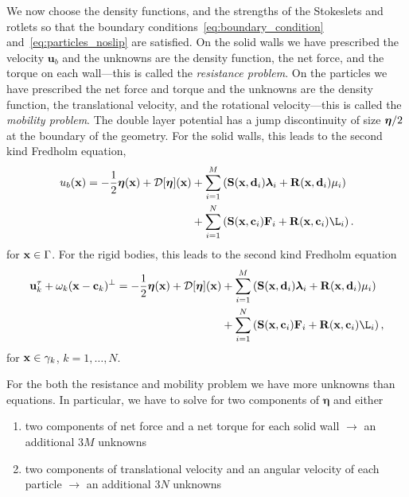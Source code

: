 \documentclass[preprint, 10pt]{elsarticle}
\begin{document}
We now choose the density functions, and the strengths of the Stokeslets
and rotlets so that the boundary
conditions~\eqref{eq:boundary_condition} and~\eqref{eq:particles_noslip}
are satisfied.  On the solid walls we have prescribed the velocity
$\mathbf{u}_b$ and the unknowns are the density function, the net force,
and the torque on each wall---this is called the {\em resistance
problem}. On the particles we have prescribed the net force and torque
and the unknowns are the density function, the translational velocity,
and the rotational velocity---this is called the {\em mobility problem}.
The double layer potential has a jump discontinuity of size ${\boldsymbol\eta}/2$ at
the boundary of the geometry.  For the solid walls, this leads to the
second kind Fredholm equation,
\begin{equation}
  \label{eq:vel_walls} 
  \begin{aligned}
  u_b(\xx) = -\frac{1}{2}\eeta(\xx) + 
    \mathcal{D}[\eeta](\mathbf{x}) 
    &+ \sum_{i=1}^{M} \left(\mathbf{S}(\xx,\dd_i)\llambda_i +
    \mathbf{R}(\xx,\dd_i)\mu_i\right)  \\
    &+ \sum_{i=1}^{N} \left(\mathbf{S}(\xx,\cc_i)\FF_i +
    \mathbf{R}(\xx,\cc_i)\L_i\right).
  \end{aligned}
\end{equation}
for ${\mathbf{x}} \in \Gamma$.  For the rigid bodies, this leads to the second kind Fredholm equation
\begin{equation}
  \label{eq:vel_particles} 
  \begin{aligned}
  \uu_k^\tau + \omega_k(\xx - \cc_k)^\perp
  = -\frac{1}{2}\eeta(\xx) + 
    \mathcal{D}[\eeta](\mathbf{x}) 
    &+ \sum_{i=1}^{M} \left(\mathbf{S}(\xx,\dd_i)\llambda_i +
    \mathbf{R}(\xx,\dd_i)\mu_i\right) \\
    &+ \sum_{i=1}^{N} \left(\mathbf{S}(\xx,\cc_i)\FF_i +
    \mathbf{R}(\xx,\cc_i)\L_i\right),
  \end{aligned}
\end{equation}
for ${\mathbf{x}} \in \gamma_k$, $k=1,\ldots,N$.

For the both the resistance and mobility problem we have more unknowns than equations. In particular, we have to solve for two components of $\pmb{\eta}$ and either 
\begin{enumerate}[label=(\alph*)]
	\item two components of net force and a net torque for each solid wall $\rightarrow$ an additional $3M$ unknowns
	\item two components of translational velocity and an angular velocity of each particle $\rightarrow$ an additional $3N$ unknowns
\end{enumerate}
\end{document}
